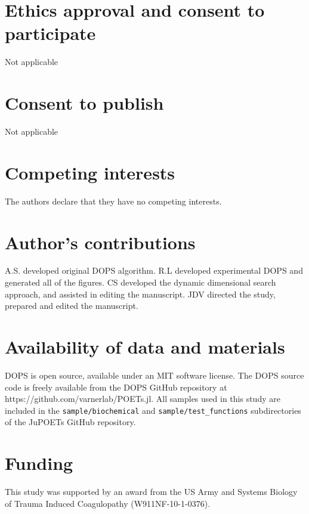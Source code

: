 \documentclass{bmcart}
\begin{document}
\begin{backmatter}

\section*{Ethics approval and consent to participate}
Not applicable

\section*{Consent to publish}
Not applicable

\section*{Competing interests}
  The authors declare that they have no competing interests.

\section*{Author's contributions}
    A.S. developed original DOPS algorithm. R.L developed experimental DOPS and generated all of the figures.
    CS developed the dynamic dimensional search approach, and assisted in editing the manuscript.
    JDV directed the study, prepared and edited the manuscript.

\section*{Availability of data and materials}
DOPS is open source, available under an MIT software license.
The DOPS source code is freely available from the DOPS GitHub repository at https://github.com/varnerlab/POETs.jl.
All samples used in this study are included in the \texttt{sample/biochemical} and \texttt{sample/test\_functions} subdirectories of the JuPOETs GitHub repository.


\section*{Funding}
This study was supported by an award from the US Army and Systems Biology of Trauma Induced Coagulopathy (W911NF-10-1-0376).



\end{backmatter}
\end{document}
